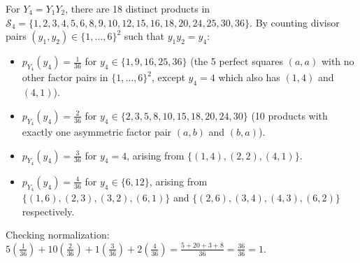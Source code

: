 \documentclass[11pt, letterpaper]{article}
\theoremstyle{definition}
\theoremstyle{remark}
\begin{document}
For $Y_4 = Y_1 Y_2$, there are 18 distinct products in $\mathcal{S}_4 = \{1, 2, 3, 4, 5, 6, 8, 9, 10, 12, 15, 16, 18, 20, 24, 25, 30, 36\}$. By counting divisor pairs $(y_1, y_2) \in \{1, \dots, 6\}^2$ such that $y_1 y_2 = y_4$:
\begin{itemize}
    \item $p_{Y_4}(y_4) = \frac{1}{36}$ for $y_4 \in \{1, 9, 16, 25, 36\}$ (the 5 perfect squares $(a, a)$ with no other factor pairs in $\{1, \dots, 6\}^2$, except $y_4 = 4$ which also has $(1,4)$ and $(4,1)$).
    \item $p_{Y_4}(y_4) = \frac{2}{36}$ for $y_4 \in \{2, 3, 5, 8, 10, 15, 18, 20, 24, 30\}$ (10 products with exactly one asymmetric factor pair $(a, b)$ and $(b, a)$).
    \item $p_{Y_4}(y_4) = \frac{3}{36}$ for $y_4 = 4$, arising from $\{(1,4), (2,2), (4,1)\}$.
    \item $p_{Y_4}(y_4) = \frac{4}{36}$ for $y_4 \in \{6, 12\}$, arising from $\{(1,6), (2,3), (3,2), (6,1)\}$ and $\{(2,6), (3,4), (4,3), (6,2)\}$ respectively.
\end{itemize}
Checking normalization: $5\left(\frac{1}{36}\right) + 10\left(\frac{2}{36}\right) + 1\left(\frac{3}{36}\right) + 2\left(\frac{4}{36}\right) = \frac{5 + 20 + 3 + 8}{36} = \frac{36}{36} = 1$.
\end{document}
